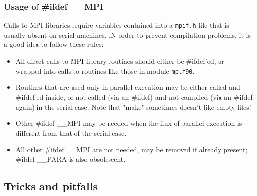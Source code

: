\documentclass[12pt,a4paper]{article}
\begin{document}
\subsubsection{Usage of \#ifdef \_\_MPI}
Calls to MPI libraries require variables contained into a 
\texttt{mpif.h} file that is usually absent on serial machines.
IN order to prevent compilation problems, it is a good idea to
follow these rules:
\begin{itemize}
\item All direct calls to MPI library routines should either be 
\#ifdef'ed, or wrapped into calls to routines like those in
module \texttt{mp.f90}.
\item Routines that are used only in parallel execution may be either
called and \#ifdef'ed inside, or not called (via an \#ifdef) and not 
compiled (via an \#ifdef again) in the serial case. Note that "make" 
sometimes doesn't like empty files!
\item Other \#ifdef \_\_MPI may be needed when the flux of parallel
execution is different from that of the serial case.
\item All other \#ifdef \_\_MPI are not needed, may be removed if
already present; \#ifdef \_\_PARA is also obsolescent.
\end{itemize}

\subsection{Tricks and pitfalls}
\end{document}
